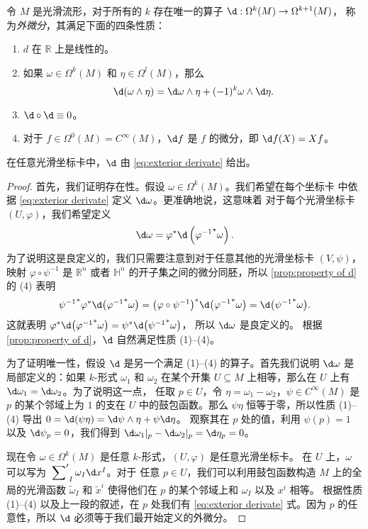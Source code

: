 \begin{theorem}[外微分的存在唯一性]
  令 $M$ 是光滑流形，对于所有的 $k$ 存在唯一的算子 $\d:\Omega^k(M)\to\Omega^{k+1}(M)$，
  称为\emph{外微分}，其满足下面的四条性质：
  \begin{enumerate}
    \item $d$ 在 $\mathbb{R}$ 上是线性的。
    \item 如果 $\omega\in\Omega^k(M)$ 和 $\eta\in\Omega^l(M)$，那么
    \[
      \d(\omega\wedge\eta)=\d\omega\wedge\eta+(-1)^k\omega\wedge \d\eta.  
    \]
    \item $\d\circ\d \equiv 0$。
    \item 对于 $f\in\Omega^0(M)=C^\infty(M)$，$\d f$ 是 $f$ 的微分，即
    $\d f(X)=Xf$。
  \end{enumerate}
  在任意光滑坐标卡中，$\d$ 由 \eqref{eq:exterior derivate} 给出。
\end{theorem}
\begin{proof}
  首先，我们证明存在性。假设 $\omega\in\Omega^k(M)$。我们希望在每个坐标卡
  中依据 \eqref{eq:exterior derivate} 定义 $\d\omega$。更准确地说，这意味着
  对于每个光滑坐标卡 $(U,\varphi)$，我们希望定义
  \begin{equation}
    \d\omega=\varphi^*\d\left({\varphi^{-1}}^*\omega\right).
  \end{equation}
  为了说明这是良定义的，我们只需要注意到对于任意其他的光滑坐标卡 $(V,\psi)$，
  映射 $\varphi\circ\psi^{-1}$ 是 $\mathbb{R}^n$ 或者 $\mathbb{H}^n$
  的开子集之间的微分同胚，所以 \autoref{prop:property of d} 的 (4) 表明
  \[
    {\psi^{-1}}^*\varphi^*\d\bigl({\varphi^{-1}}^*\omega\bigr)=
    \bigl(\varphi\circ\psi^{-1}\bigr)^*\d\bigl({\varphi^{-1}}^*\omega\bigr)
    =\d\bigl({\psi^{-1}}^*\omega\bigr).
  \]
  这就表明 $\varphi^*\d\bigl({\varphi^{-1}}^*\omega\bigr)=\psi^*\d\bigl({\psi^{-1}}^*\omega\bigr)$，
  所以 $\d\omega$ 是良定义的。
  根据 \autoref{prop:property of d}，$\d$ 自然满足性质 (1)--(4)。

  为了证明唯一性，假设 $\d$ 是另一个满足 (1)--(4) 的算子。首先我们说明
  $\d\omega$ 是局部定义的：如果 $k$-形式 $\omega_1$ 和 $\omega_2$ 在某个开集 $U\subseteq M$
  上相等，那么在 $U$ 上有 $\d\omega_1=\d\omega_2$。为了说明这一点，
  任取 $p\in U$，令 $\eta=\omega_1-\omega_2$，$\psi\in C^\infty(M)$
  是 $p$ 的某个邻域上为 $1$ 的支在 $U$ 中的鼓包函数。那么 $\psi\eta$
  恒等于零，所以性质 (1)--(4) 导出 $0=\d(\psi\eta)=\d\psi\wedge\eta+\psi\d\eta$。
  观察其在 $p$ 处的值，利用 $\psi(p)=1$ 以及 $\d\psi_p=0$，我们得到
  $\d\omega_1|_p-\d\omega_2|_p=\d\eta_p=0$。

  现在令 $\omega\in\Omega^k(M)$ 是任意 $k$-形式，$(U,\varphi)$ 是任意光滑坐标卡。
  在 $U$ 上，$\omega$ 可以写为 $\sideset{}{'}{\sum}_I\omega_I\d x^I$。对于 
  任意 $p\in U$，我们可以利用鼓包函数构造 $M$ 上的全局的光滑函数 $\tilde\omega_I$
  和 $\tilde{x}^i$ 使得他们在 $p$ 的某个邻域上和 $\omega_I$ 以及 $x^i$ 相等。
  根据性质 (1)--(4) 以及上一段的叙述，在 $p$ 处我们有 \eqref{eq:exterior derivate}
  式。因为 $p$ 的任意性，所以 $\d$ 必须等于我们最开始定义的外微分。
\end{proof}

